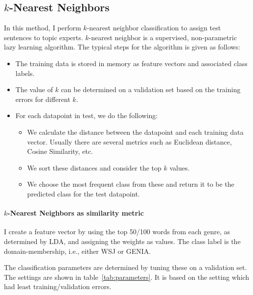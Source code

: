 \subsection{$k$-Nearest Neighbors}

In this method, I perform $k$-nearest neighbor classification to assign test sentences to topic experts. 
$k$-nearest neighbor is a supervised, non-parametric lazy learning algorithm. The typical steps for the algorithm is given as follows:

\begin{itemize}
    \item  The training data is stored in memory as feature vectors and associated class labels.
    \item The value of $k$ can be determined on a validation set based on the training errors for different $k$.
    \item For each datapoint in test, we do the following:
    \begin{itemize}
        \item We calculate the distance between the datapoint and each training data vector. Usually there are several metrics such as Euclidean distance, Cosine Similarity, etc.
        \item We sort these distances and consider the top $k$ values. 
        \item We choose the most frequent class from these and return it to be the predicted class for the test datapoint.
    \end{itemize}
\end{itemize}

\paragraph*{$k$-Nearest Neighbors as similarity metric}
I create a feature vector by using the top 50/100 words from each genre, as determined by LDA, and assigning the weights as values. The class label is the domain-membership, i.e., either WSJ or GENIA.

The classification parameters are determined by tuning these on a validation set. The settings are shown in table~\ref{tab:parameters}. It is based on the setting which had least training/validation errors.

